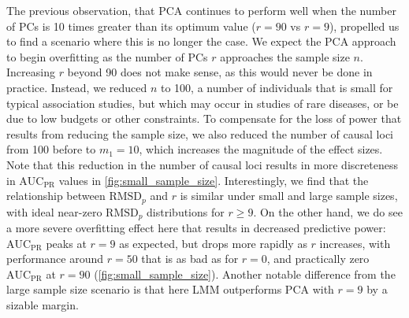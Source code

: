\documentclass[11pt]{article}
\newcommand{\rmsd}{\text{RMSD}_p}
\newcommand{\auc}{\text{AUC}_\text{PR}}
\begin{document}
The previous observation, that PCA continues to perform well when the number of PCs is 10 times greater than its optimum value ($r = 90$ vs $r = 9$), propelled us to find a scenario where this is no longer the case.
We expect the PCA approach to begin overfitting as the number of PCs $r$ approaches the sample size $n$.
Increasing $r$ beyond 90 does not make sense, as this would never be done in practice.
Instead, we reduced $n$ to 100, a number of individuals that is small for typical association studies, but which may occur in studies of rare diseases, or be due to low budgets or other constraints.
To compensate for the loss of power that results from reducing the sample size, we also reduced the number of causal loci from 100 before to $m_1 = 10$, which increases the magnitude of the effect sizes.
Note that this reduction in the number of causal loci results in more discreteness in $\auc$ values in \cref{fig:small_sample_size}.
Interestingly, we find that the relationship between $\rmsd$ and $r$ is similar under small and large sample sizes, with ideal near-zero $\rmsd$ distributions for $r \ge 9$.
On the other hand, we do see a more severe overfitting effect here that results in decreased predictive power: $\auc$ peaks at $r = 9$ as expected, but drops more rapidly as $r$ increases, with performance around $r = 50$ that is as bad as for $r = 0$, and practically zero $\auc$ at $r = 90$ (\cref{fig:small_sample_size}).
Another notable difference from the large sample size scenario is that here LMM outperforms PCA with $r=9$ by a sizable margin.
\end{document}
